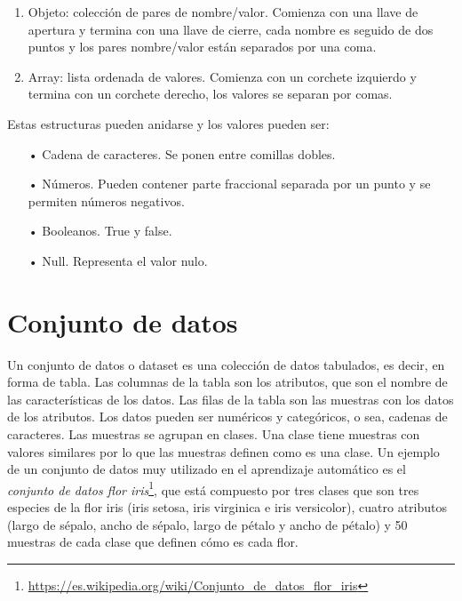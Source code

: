\documentclass[a4paper, 12pt]{book}
\begin{document}
\begin{enumerate}
	\item Objeto: colección de pares de nombre/valor. Comienza con una llave de apertura y termina con una llave de cierre, cada nombre es seguido de dos puntos y los pares nombre/valor están separados por una coma.
	\item Array: lista ordenada de valores. Comienza con un corchete izquierdo y termina con un corchete derecho, los valores se separan por comas.
\end{enumerate}

Estas estructuras pueden anidarse y los valores pueden ser:
	\begin{itemize}
		\item[•] Cadena de caracteres. Se ponen entre comillas dobles.
		\item[•] Números. Pueden contener parte fraccional separada por un punto y se permiten números negativos.
		\item[•] Booleanos. True y false.
		\item[•] Null. Representa el valor nulo.
	\end{itemize}

\section{Conjunto de datos} 
\label{sec:dataset}

Un conjunto de datos o dataset es una colección de datos tabulados, es decir, en forma de tabla. 
Las columnas de la tabla son los atributos, que son el nombre de las características de los datos. 
Las filas de la tabla son las muestras con los datos de los atributos. Los datos pueden ser numéricos y categóricos, o sea, cadenas de caracteres. 
Las muestras se agrupan en clases. Una clase tiene muestras con valores similares por lo que las muestras definen como es una clase. 
Un ejemplo de un conjunto de datos muy utilizado en el aprendizaje automático es el \emph{conjunto de datos flor iris}\footnote{\url{https://es.wikipedia.org/wiki/Conjunto_de_datos_flor_iris}}, que está compuesto por tres clases que son tres especies de la flor iris (iris setosa, iris virginica e iris versicolor), cuatro atributos (largo de sépalo, ancho de sépalo, largo de pétalo y ancho de pétalo) y 50 muestras de cada clase que definen cómo es cada flor.

\end{document}
